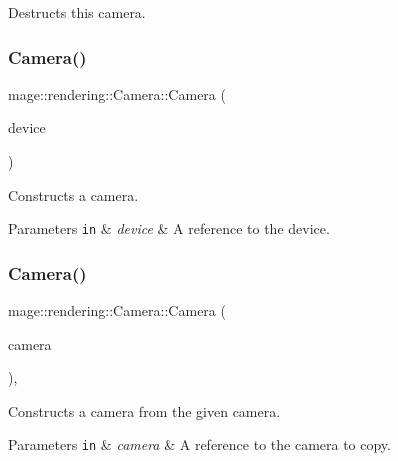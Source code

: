 Destructs this camera. \mbox{\label{classmage_1_1rendering_1_1_camera_a872aafc40d35c1481a4147c73fdbc00a}} 
\subsubsection{\texorpdfstring{Camera()}{Camera()}\hspace{0.1cm}{\footnotesize\ttfamily [1/3]}}
{\footnotesize\ttfamily mage\+::rendering\+::\+Camera\+::\+Camera (\begin{DoxyParamCaption}\item[{I\+D3\+D11\+Device \&}]{device }\end{DoxyParamCaption})\hspace{0.3cm}{\ttfamily [protected]}}

Constructs a camera.


\begin{DoxyParams}[1]{Parameters}
\mbox{\tt in}  & {\em device} & A reference to the device. \\
\hline
\end{DoxyParams}
\mbox{\label{classmage_1_1rendering_1_1_camera_ac4e1e9f230416c0aaea12d2b0fff02c1}} 
\subsubsection{\texorpdfstring{Camera()}{Camera()}\hspace{0.1cm}{\footnotesize\ttfamily [2/3]}}
{\footnotesize\ttfamily mage\+::rendering\+::\+Camera\+::\+Camera (\begin{DoxyParamCaption}\item[{const \mbox{\hyperlink{classmage_1_1rendering_1_1_camera}{Camera}} \&}]{camera }\end{DoxyParamCaption})\hspace{0.3cm}{\ttfamily [protected]}, {\ttfamily [delete]}}

Constructs a camera from the given camera.


\begin{DoxyParams}[1]{Parameters}
\mbox{\tt in}  & {\em camera} & A reference to the camera to copy. \\
\hline
\end{DoxyParams}
\mbox{\label{classmage_1_1rendering_1_1_camera_a7ac683929b75589e3f396a76a6afb9cf}} 
